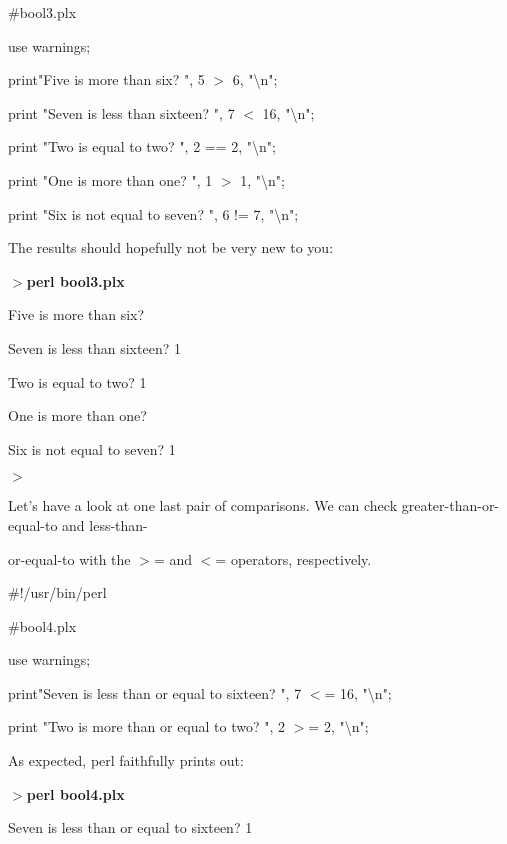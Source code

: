 \documentclass[a4paper,11pt]{book}
\begin{document}
\noindent \#bool3.plx

\noindent use warnings;

\noindent print"Five is more than six? ", 5 $>$  6, "\textbackslash n";

\noindent print "Seven is less than sixteen? ", 7 $<$ 16, "\textbackslash n";

\noindent print "Two is equal to two? ", 2 == 2, "\textbackslash n";

\noindent print "One is more than one? ", 1 $>$  1, "\textbackslash n";

\noindent print "Six is not equal to seven? ",  6 != 7, "\textbackslash n";

\noindent 

\noindent The results should hopefully not be very new to you:

\noindent 

\noindent $>$\textbf{perl bool3.plx}

\noindent Five is more than six?

\noindent Seven is less than sixteen? 1 

\noindent Two is equal to two? 1

\noindent One is more than one?

\noindent Six is not equal to seven? 1

\noindent $>$

\noindent 

\noindent Let's have a look at one last pair of comparisons. We can check greater-than-or-equal-to and less-than-

\noindent or-equal-to with the $>$= and $<$= operators, respectively.

\noindent 

\noindent 

\noindent \#!/usr/bin/perl

\noindent \#bool4.plx

\noindent use warnings;

\noindent print"Seven is less than or equal to sixteen? ", 7 $<$= 16, "\textbackslash n";

\noindent print "Two is more than or equal to two? ", 2 $>$= 2,  "\textbackslash n";

\noindent 

\noindent As expected, perl faithfully prints out:

\noindent 

\noindent $>$\textbf{perl bool4.plx}

\noindent Seven is less than or equal to sixteen? 1
\end{document}
